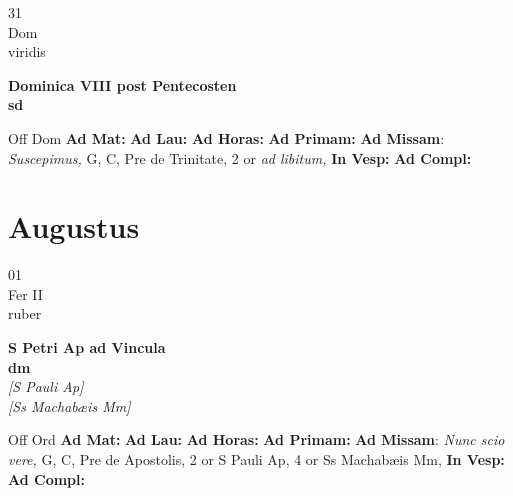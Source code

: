 \documentclass[10pt, openany]{book}
\begin{document}
    \begin{center}
        \begin{minipage}{3.5in}
            \vspace{2em}
            \begin{minipage}{0.5in}
                {\Huge 31} \\
                {\normalsize Dom} \\
                {\normalsize viridis}
            \end{minipage}
            \begin{minipage}{3.0in}
                \textbf{ \large Dominica VIII post Pentecosten \\
                \textnormal{\normalsize sd}} \\ 
            \end{minipage}
            \begin{justify}Off Dom
                \textbf{Ad Mat: }
                \textbf{Ad Lau: }
                \textbf{Ad Horas: }
                \textbf{Ad Primam: }\textbf{Ad Missam}: \textit{Suscepimus,} G, C, Pre de Trinitate, 2 or \textit{ad libitum,}  
                \textbf{In Vesp: }
                \textbf{Ad Compl: }
            \end{justify}
        \end{minipage}
    \end{center}

    \chapter{Augustus}
                    
    \begin{center}
        \begin{minipage}{3.5in}
            \vspace{2em}
            \begin{minipage}{0.5in}
                {\Huge 01} \\
                {\normalsize Fer II} \\
                {\normalsize ruber}
            \end{minipage}
            \begin{minipage}{3.0in}
                \textbf{ \large S Petri Ap ad Vincula \\
                \textnormal{\normalsize dm}} \\ \textit{[S Pauli Ap]} \\ \textit{[Ss Machabæis Mm]} \\ 
            \end{minipage}
            \begin{justify}Off Ord
                \textbf{Ad Mat: }
                \textbf{Ad Lau: }
                \textbf{Ad Horas: }
                \textbf{Ad Primam: }\textbf{Ad Missam}: \textit{Nunc scio vere,} G, C, Pre de Apostolis, 2 or S Pauli Ap, 4 or Ss Machabæis Mm,  
                \textbf{In Vesp: }
                \textbf{Ad Compl: }
            \end{justify}
        \end{minipage}
    \end{center}
\end{document}

